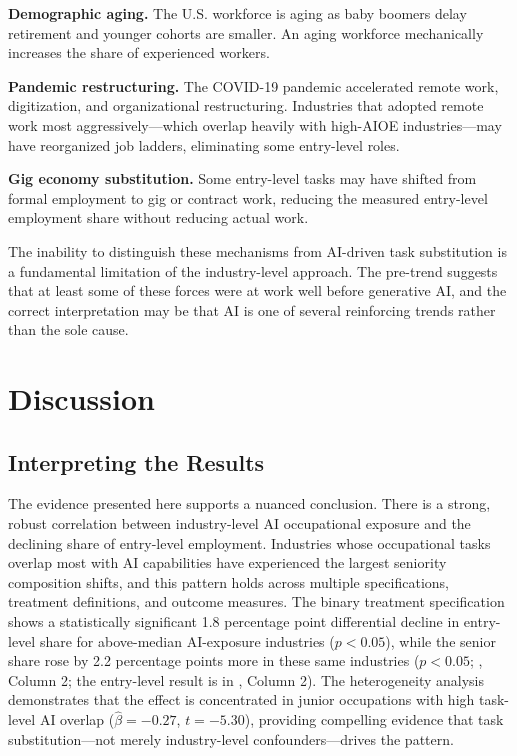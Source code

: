 \documentclass[12pt]{article}
\begin{document}
\textbf{Demographic aging.} The U.S. workforce is aging as baby boomers delay retirement and younger cohorts are smaller. An aging workforce mechanically increases the share of experienced workers.

\textbf{Pandemic restructuring.} The COVID-19 pandemic accelerated remote work, digitization, and organizational restructuring. Industries that adopted remote work most aggressively---which overlap heavily with high-AIOE industries---may have reorganized job ladders, eliminating some entry-level roles.

\textbf{Gig economy substitution.} Some entry-level tasks may have shifted from formal employment to gig or contract work, reducing the measured entry-level employment share without reducing actual work.

The inability to distinguish these mechanisms from AI-driven task substitution is a fundamental limitation of the industry-level approach. The pre-trend suggests that at least some of these forces were at work well before generative AI, and the correct interpretation may be that AI is one of several reinforcing trends rather than the sole cause.


\section{Discussion}

\subsection{Interpreting the Results}

The evidence presented here supports a nuanced conclusion. There is a strong, robust correlation between industry-level AI occupational exposure and the declining share of entry-level employment. Industries whose occupational tasks overlap most with AI capabilities have experienced the largest seniority composition shifts, and this pattern holds across multiple specifications, treatment definitions, and outcome measures. The binary treatment specification shows a statistically significant 1.8 percentage point differential decline in entry-level share for above-median AI-exposure industries ($p < 0.05$), while the senior share rose by 2.2 percentage points more in these same industries ($p < 0.05$; , Column 2; the entry-level result is in , Column 2). The heterogeneity analysis demonstrates that the effect is concentrated in junior occupations with high task-level AI overlap ($\hat{\beta} = -0.27$, $t = -5.30$), providing compelling evidence that task substitution---not merely industry-level confounders---drives the pattern.
\end{document}
